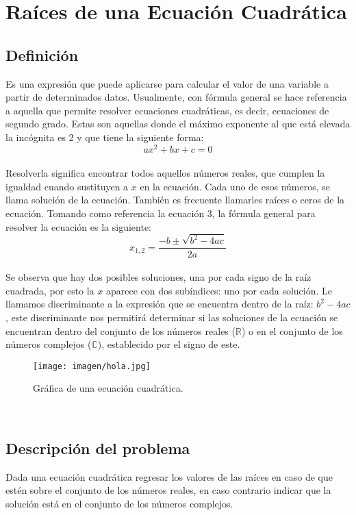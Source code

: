 \section{Raíces de una Ecuación Cuadrática}

\subsection{Definición}
Es una expresión que puede aplicarse para calcular el valor de una variable a partir de determinados datos.
Usualmente, con fórmula general se hace referencia a aquella que permite resolver ecuaciones cuadráticas, es decir, ecuaciones de segundo grado. Estas son aquellas donde el máximo exponente al que está elevada la incógnita es 2 y que tiene la siguiente forma:
\begin{equation}
    ax^2 + bx + c = 0
\end{equation}\\
Resolverla significa encontrar todos aquellos números reales, que cumplen la igualdad cuando sustituyen a $x$ en la ecuación. Cada uno de esos números, se llama solución de la ecuación. También es frecuente llamarles raíces o ceros de la ecuación.
Tomando como referencia la ecuación 3, la fórmula general para resolver la ecuación es la siguiente:
\begin{equation}
    x_{1, 2} = \frac{-b \pm \sqrt{b^2-4ac}}{2a}
\end{equation}\\
 Se observa que hay dos posibles soluciones, una por cada signo de la raíz cuadrada, por esto la $x$ aparece con dos subíndices: uno por cada solución.
 Le llamamos  discriminante a la expresión que se encuentra dentro de la raíz: $ b^2-4ac $, este discriminante nos permitirá determinar si las soluciones de la ecuación se encuentran dentro del conjunto de los números reales ($\mathbb{R}$) o en el conjunto de los números complejos ($\mathbb{C}$), establecido por el signo de este.\cite{FormulaGeneral} \\
\begin{figure}[h!]
\centering
\texttt{[image: imagen/hola.jpg]}
\caption{Gráfica de una ecuación cuadrática.}
\label{fig:grafica}
\end{figure}
\\

 \subsection{Descripción del problema}
Dada una ecuación cuadrática regresar los valores de las raíces en caso de que estén sobre el conjunto de los números reales, en caso contrario indicar que la solución está en el conjunto de los números complejos.

